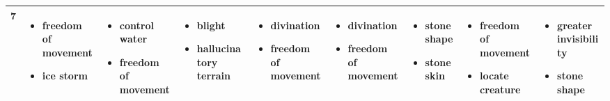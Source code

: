 \begin{table}
\begin{tabular}{cp{3cm}p{3cm}p{3cm}p{3cm}p{3cm}p{3cm}p{3cm}p{3cm}}
	7 & 
	\begin{itemize}
		\item freedom of movement
		\item ice storm
	\end{itemize}&
	\begin{itemize}
		\item control water
		\item freedom of movement
	\end{itemize}& 
	\begin{itemize}
		\item blight
		\item hallucinatory terrain
	\end{itemize}&
	\begin{itemize}
		\item divination
		\item freedom of movement
	\end{itemize}&
	\begin{itemize}
		\item divination
		\item freedom of movement
	\end{itemize}&
	\begin{itemize}
		\item stone shape
		\item stoneskin
	\end{itemize}&
	\begin{itemize}
		\item freedom of movement
		\item locate creature
	\end{itemize}&
	\begin{itemize}
		\item greater invisibility
		\item stone shape
	\end{itemize}\\ \hline
	

\end{tabular}
\end{table}
